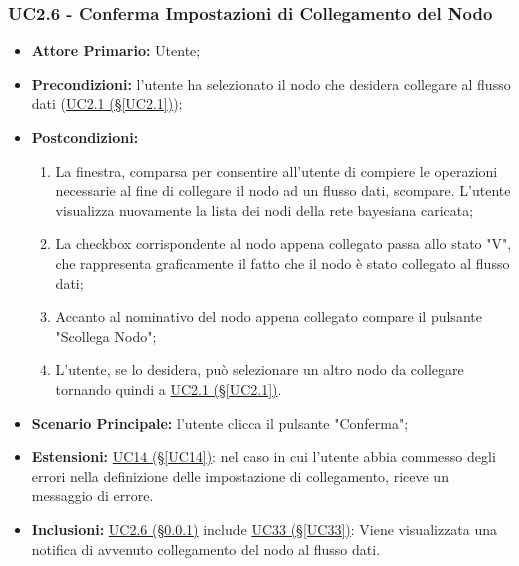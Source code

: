\subsubsection{UC2.6 - Conferma Impostazioni di Collegamento del Nodo}\label{UC2.6}
\begin{itemize}
\item \textbf{Attore Primario:} Utente;
\item \textbf{Precondizioni:} l'utente ha selezionato il nodo che desidera collegare al flusso dati 					(\hyperref[UC2.1]{UC2.1 (§\ref*{UC2.1})});
\item \textbf{Postcondizioni:}
	\begin{enumerate}
	\item La finestra, comparsa per consentire all'utente di compiere le operazioni necessarie al fine di collegare il 		nodo ad un flusso dati, scompare. L'utente visualizza nuovamente la lista dei nodi della rete bayesiana caricata;
	\item La checkbox corrispondente al nodo appena collegato passa allo stato "V", che rappresenta graficamente il fatto che il nodo è stato collegato al flusso dati;
	\item Accanto al nominativo del nodo appena collegato compare il pulsante "Scollega Nodo";
	\item L'utente, se lo desidera, può selezionare un altro nodo da collegare tornando quindi a \hyperref[UC2.1]{UC2.1 (§\ref*{UC2.1})}.
	\end{enumerate}
\item \textbf{Scenario Principale:} l'utente clicca il pulsante "Conferma";
\item \textbf{Estensioni:} \hyperref[UC14]{UC14 (§\ref*{UC14})}: nel caso in cui l'utente abbia commesso degli errori nella definizione delle impostazione di collegamento, riceve un messaggio di errore.
\item \textbf{Inclusioni:} \hyperref[UC2.6]{UC2.6 (§\ref*{UC2.6})} include \hyperref[UC33]{UC33 (§\ref*{UC33})}: Viene visualizzata una notifica di avvenuto collegamento del nodo al flusso dati. 
\end{itemize}

\pagebreak

